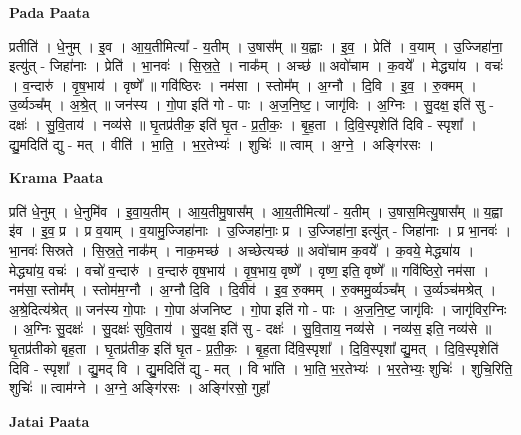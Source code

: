 \documentclass[17pt]{extarticle}
\begin{document}
\textbf{Pada Paata} \newline

प्रतीति॑ । धे॒नुम् । इ॒व । आ॒य॒तीमित्या᳚ - य॒तीम् । उ॒षास᳚म् ॥ य॒ह्वाः । इ॒व॒ । प्रेति॑ । व॒याम् । उ॒ज्जिहा॑ना॒ इत्यु॑त् - जिहा॑नाः । प्रेति॑ । भा॒नवः॑ । सि॒स्र॒ते॒ । नाक᳚म् । अच्छ॑ ॥ अवो॑चाम । क॒वये᳚ । मेद्ध्या॑य । वचः॑ । व॒न्दारु॑ । वृ॒ष॒भाय॑ । वृष्णे᳚ ॥ गवि॑ष्ठिरः । नम॑सा । स्तोम᳚म् । अ॒ग्नौ । दि॒वि । इ॒व॒ । रु॒क्मम् । उ॒र्व्यञ्च᳚म् । अ॒श्रे॒त् ॥ जन॑स्य । गो॒पा इति॑ गो - पाः । अ॒ज॒नि॒ष्ट॒। जागृ॑विः । अ॒ग्निः । सु॒दक्ष॒ इति॑ सु - दक्षः॑ । सु॒वि॒ताय॑ । नव्य॑से ॥ घृ॒तप्र॑तीक॒ इति॑ घृ॒त - प्र॒ती॒कः॒ । बृ॒ह॒ता । दि॒वि॒स्पृशेति॑ दिवि - स्पृशा᳚ । द्यु॒मदिति॑ द्यु - मत् । वीति॑ । भा॒ति॒ । भ॒र॒तेभ्यः॑ । शुचिः॑ ॥ त्वाम् । अ॒ग्ने॒ । अङ्गि॑रसः ।  \newline


\textbf{Krama Paata} \newline

प्रति॑ धे॒नुम् । धे॒नुमि॑व । इ॒वा॒य॒तीम् । आ॒य॒तीमु॒षास᳚म् । आ॒य॒तीमित्या᳚ - य॒तीम् । उ॒षास॒मित्यु॒षास᳚म् ॥ य॒ह्वा इ॑व । इ॒व॒ प्र । प्र व॒याम् । व॒यामु॒ज्जिहा॑नाः । उ॒ज्जिहा॑नाः॒ प्र । उ॒ज्जिहा॑ना॒ इत्यु॑त् - जिहा॑नाः । प्र भा॒नवः॑ । भा॒नवः॑ सिस्रते । सि॒स्र॒ते॒ नाक᳚म् । नाक॒मच्छ॑ । अच्छेत्यच्छ॑ ॥ अवो॑चाम क॒वये᳚ । क॒वये॒ मेद्ध्या॑य । मेद्ध्या॑य॒ वचः॑ । वचो॑ व॒न्दारु॑ । व॒न्दारु॑ वृष॒भाय॑ । वृ॒ष॒भाय॒ वृष्णे᳚ । वृष्ण॒ इति॒ वृष्णे᳚ ॥ गवि॑ष्ठिरो॒ नम॑सा । नम॑सा॒ स्तोम᳚म् । स्तोम॑म॒ग्नौ । अ॒ग्नौ दि॒वि । दि॒वीव॑ । इ॒व॒ रु॒क्मम् । रु॒क्ममु॒र्व्यञ्च᳚म् । उ॒र्व्यञ्च॑मश्रेत् । अ॒श्रे॒दित्य॑श्रेत् ॥ जन॑स्य गो॒पाः । गो॒पा अ॑जनिष्ट । गो॒पा इति॑ गो - पाः । अ॒ज॒नि॒ष्ट॒ जागृ॑विः । जागृ॑विर॒ग्निः । अ॒ग्निः सु॒दक्षः॑ । सु॒दक्षः॑ सुवि॒ताय॑ । सु॒दक्ष॒ इति॑ सु - दक्षः॑ । सु॒वि॒ताय॒ नव्य॑से । नव्य॑स॒ इति॒ नव्य॑से ॥ घृ॒तप्र॑तीको बृह॒ता । घृ॒तप्र॑तीक॒ इति॑ घृ॒त - प्र॒ती॒कः॒ । बृ॒ह॒ता दि॑वि॒स्पृशा᳚ । दि॒वि॒स्पृशा᳚ द्यु॒मत् । दि॒वि॒स्पृशेति॑ दिवि - स्पृशा᳚ । द्यु॒मद् वि । द्यु॒मदिति॑ द्यु - मत् । वि भा॑ति । भा॒ति॒ भ॒र॒तेभ्यः॑ । भ॒र॒तेभ्यः॒ शुचिः॑ । शुचि॒रिति॒ शुचिः॑ ॥ त्वाम॑ग्ने । अ॒ग्ने॒ अङ्गि॑रसः । अङ्गि॑रसो॒ गुहा᳚ \newline

\textbf{Jatai Paata} \newline
\end{document}
